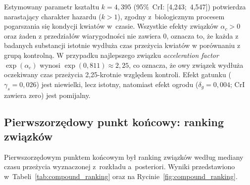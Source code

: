 \documentclass[12pt, a4paper]{article}
\begin{document}
Estymowany parametr kształtu $k = 4{,}395$ (95\%~CrI: [4,243;~4,547]) potwierdza narastający charakter hazardu ($k > 1$), zgodny z~biologicznym procesem pogarszania się kondycji kwiatów w~czasie. Wszystkie efekty związków $\alpha_c > 0$ oraz żaden z przedziałów wiarygodności nie zawiera 0, oznacza to, że każda z badanych substancji istotnie wydłuża czas przeżycia kwiatów w porównaniu z grupą kontrolną. W przypadku najlepszego związku \textit{acceleration factor} $\exp(\alpha_c)$ wynosi $\exp(0{,}811) \approx 2{,}25$, co oznacza, że owy związek wydłuża oczekiwany czas przeżycia 2,25-krotnie względem kontroli. Efekt gatunku ($\gamma_s = 0{,}026$) jest niewielki, lecz istotny, natomiast efekt ogrodu ($\delta_g = 0{,}004$; CrI zawiera zero) jest pomijalny.

\subsection{Pierwszorzędowy punkt końcowy: ranking związków}\label{subsec:ranking}

Pierwszorzędowym punktem końcowym był ranking związków według mediany czasu przeżycia wyznaczonej z~rozkładu a~posteriori. Wyniki przedstawiono w~Tabeli~\ref{tab:compound_ranking} oraz na Rycinie~\ref{fig:compound_ranking}.
\end{document}
